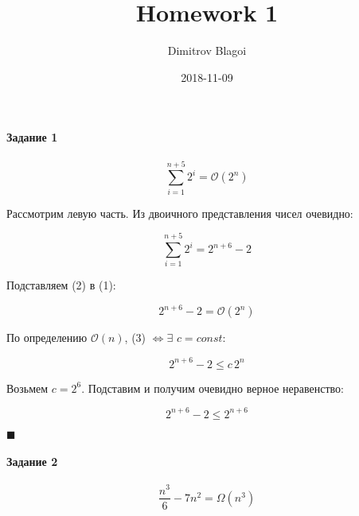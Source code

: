 \documentclass{article}
\title{Homework 1}
\date{2018-11-09}
\author{Dimitrov Blagoi}
\begin{document}

  \maketitle
  \newpage

  \newpage

  \paragraph{Задание 1}

  \begin{equation}
  	\sum\limits_{i=1}^{n+5} 2^i = \mathcal{O}(2^n)
  \end{equation}

  Рассмотрим левую часть. Из двоичного представления чисел очевидно:

  \begin{equation}
    \sum\limits_{i=1}^{n+5} 2^i = 2^{n+6} - 2
  \end{equation}

  Подставляем (2) в (1):

  \begin{equation}
    2^{n+6} - 2 = \mathcal{O}(2^n)
  \end{equation}

  По определению $\mathcal{O}(n)$, (3) $\Leftrightarrow \exists$ $c = const:$

  \begin{equation*}
    2^{n+6} - 2 \leq c \, 2^n
  \end{equation*}

  Возьмем $c = 2^6$. Подставим и получим очевидно верное неравенство:

  \begin{equation*}
    2^{n+6} - 2 \leq 2^{n+6}
  \end{equation*}
  
  \begin{flushright}
    $\blacksquare$
  \end{flushright}

  \paragraph{Задание 2}
  \setcounter{equation}{0}
  
  \begin{equation}
    \frac{n^3}{6} - 7n^2 = \Omega(n^3)
  \end{equation}
\end{document}
